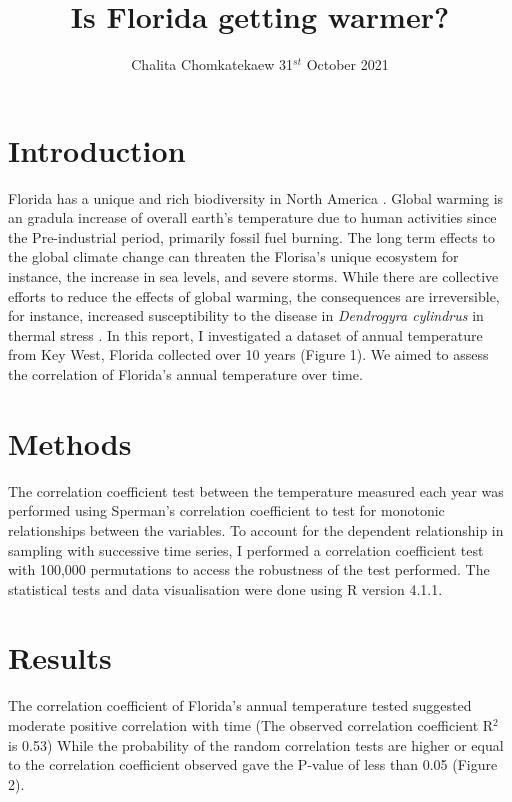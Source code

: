 \documentclass[10pt]{article}
\title{Is Florida getting warmer? \vspace{-0.5em}}
\author{Chalita Chomkatekaew 31$^{st}$ October 2021}
\date{}
\begin{document}
\maketitle

\section{Introduction \vspace{-0.5em}}
        
        Florida has a unique and rich biodiversity in North America \cite{blaustein_biodiversity_2008}. Global warming is an gradula increase of overall earth's temperature due to human activities since the Pre-industrial period, primarily fossil fuel burning. The long term effects to the global climate change can threaten the Florisa's unique ecosystem for instance, the increase in sea levels, and severe storms. While there are collective efforts to reduce the effects of global warming, the consequences are irreversible, for instance, increased susceptibility to the disease in \textit{Dendrogyra cylindrus} in thermal stress \cite{jones_temperature_2021}.  In this report, I investigated a dataset of annual temperature from Key West, Florida collected over 10 years (Figure 1). We aimed to assess the correlation of Florida's annual temperature over time. 
        
\section{Methods \vspace{-0.5em}}

		The correlation coefficient test between the temperature measured each year was performed using Sperman's correlation coefficient to test for monotonic relationships between the variables. To account for the dependent relationship in sampling with successive time series, I performed a correlation coefficient test with 100,000 permutations to access the robustness of the test performed. The statistical tests and data visualisation were done using R version 4.1.1.
		
\section{Results\vspace{-0.5em}}
     The correlation coefficient of Florida's annual temperature tested suggested moderate positive correlation with time (The observed correlation coefficient R$^{2}$ is 0.53) While the probability of the random correlation tests are higher or equal to the correlation coefficient observed gave the P-value of less than 0.05 (Figure 2). 
           
\end{document}
